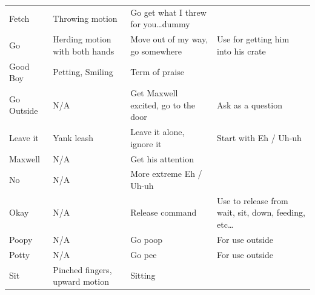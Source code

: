 \documentclass[pdftex,12pt]{article}
\begin{document}
\begin{table}[H]
\begin{adjustwidth}{-4.5cm}{-4.5cm}
\begin{center}
\begin{tabular}{lp{}p{}p{}}
                Fetch       & Throwing motion                                  & Go get
                what I threw for you\ldots dummy                   &                                                                    \\
                Go          & Herding motion with both hands                   & Move out of my way, go somewhere                      & Use for getting him into his crate                                 \\
                Good Boy    & Petting, Smiling                                 & Term of praise                                        &                                                                    \\
                Go Outside  & N/A                                              & Get Maxwell excited, go to the door                   & Ask as a question                    \\
                Leave it    & Yank leash                                       & Leave it alone, ignore it                             & Start with Eh / Uh-uh                                              \\
                Maxwell     & N/A                                              & Get his attention                                     &                                                                    \\
                No          & N/A                                              & More extreme Eh / Uh-uh                               &                                                                    \\
                Okay        & N/A                                              & Release
                command                                       & Use to release from
                wait, sit, down, feeding, etc\ldots                \\
                Poopy       & N/A                                              & Go poop                               & For use outside                                                    \\
                Potty       & N/A                                              & Go pee                                & For use outside                                                    \\
                Sit         & Pinched fingers, upward motion                   & Sitting                                               &                                                                    \\

\end{tabular}
\end{center}
\end{adjustwidth}
\end{table}
\end{document}

